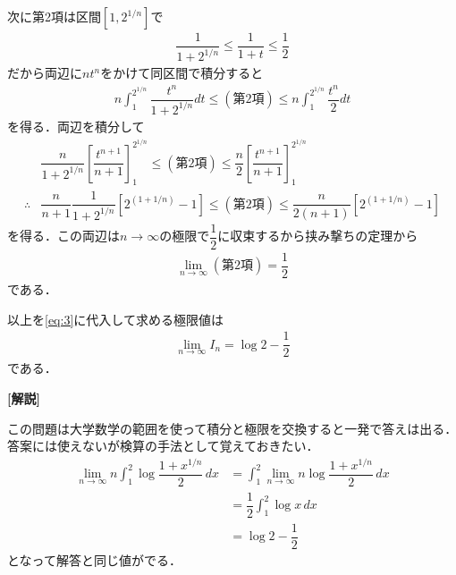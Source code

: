 \documentclass[../../main.tex]{subfiles}
\begin{document}
次に第2項は区間$[1,2^{1/n}]$で
\begin{align}
  \dfrac{1}{1+2^{1/n}} \le \dfrac{1}{1+t} \le \dfrac{1}{2}
\end{align}
だから両辺に$nt^n$をかけて同区間で積分すると
\begin{align}
  n\int_{1}^{2^{1/n}}\dfrac{t^n}{1+2^{1/n}} dt \le (\text{第2項}) \le n\int_{1}^{2^{1/n}}\dfrac{t^n}{2} dt
\end{align}
を得る．両辺を積分して
\begin{align}
  & \dfrac{n}{1+2^{1/n}}\left[\dfrac{t^{n+1}}{n+1}\right]_{1}^{2^{1/n}}
  \le (\text{第2項})
  \le \dfrac{n}{2}\left[\dfrac{t^{n+1}}{n+1}\right]_{1}^{2^{1/n}} \\
  \therefore
  & \dfrac{n}{n+1}\dfrac{1}{1+2^{1/n}}\left[2^{(1+1/n)}-1\right]
  \le (\text{第2項})
  \le \dfrac{n}{2(n+1)}\left[2^{(1+1/n)}-1\right]
\end{align}
を得る．この両辺は$n\to\infty$の極限で$\dfrac{1}{2}$に収束するから挟み撃ちの定理から
\begin{align}
  \lim_{n\to\infty}(\text{第2項}) = \dfrac{1}{2}
\end{align}
である．

以上を\cref{eq:3}に代入して求める極限値は
\begin{align}
  \lim_{n\to\infty}I_n = \log 2 - \dfrac{1}{2}
\end{align}
である．

{\bf [解説]}

この問題は大学数学の範囲を使って積分と極限を交換すると一発で答えは出る．
答案には使えないが検算の手法として覚えておきたい．
\begin{align}
  \lim_{n\to\infty}n\int_1^2\log\dfrac{1+x^{1/n}}{2}\,dx
  &=\int_1^2\lim_{n\to\infty}n\log\dfrac{1+x^{1/n}}{2}\,dx \\
  &= \dfrac{1}{2}\int_1^2\log x\,dx\\
  &=\log2-\dfrac{1}{2}
\end{align}
となって解答と同じ値がでる．

\end{document}
